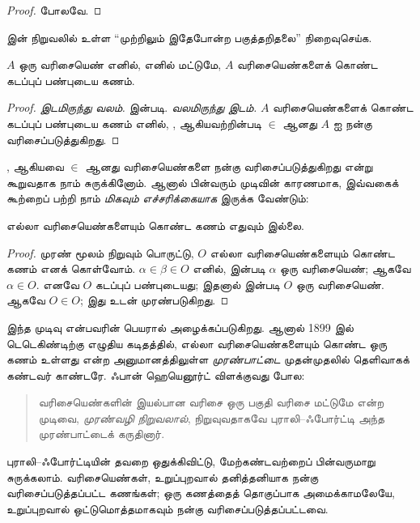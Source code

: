 \documentclass[../../../include/open-logic-section]{subfiles}
\begin{document}
\begin{proof}
 போலவே.
\end{proof}

\begin{prob}
 இன் நிறுவலில் உள்ள
``முற்றிலும் இதேபோன்ற பகுத்தறிதலை'' நிறைவுசெய்க.
\end{prob}

\begin{cor}
$A$ ஒரு வரிசையெண் எனில், எனில் மட்டுமே, $A$ வரிசையெண்களைக் கொண்ட
கடப்புப் பண்புடைய கணம்.
\end{cor}

\begin{proof}
\emph{இடமிருந்து வலம்.}  இன்படி.
\emph{வலமிருந்து இடம்.} $A$ வரிசையெண்களைக் கொண்ட கடப்புப் பண்புடைய
கணம் எனில், , 
ஆகியவற்றின்படி $\in$ ஆனது $A$ ஐ நன்கு வரிசைப்படுத்துகிறது.
\end{proof}

,  ஆகியவை $\in$ ஆனது
வரிசையெண்களை நன்கு வரிசைப்படுத்துகிறது என்று கூறுவதாக நாம் சுருக்கினோம்.
ஆனால் பின்வரும் முடிவின் காரணமாக, இவ்வகைக் கூற்றைப் பற்றி நாம்
\emph{மிகவும் எச்சரிக்கையாக} இருக்க வேண்டும்:

\begin{thm}[புராலி--ஃபோர்ட்டி முரணுரை]
எல்லா வரிசையெண்களையும் கொண்ட கணம் எதுவும் இல்லை.
\end{thm}

\begin{proof}
முரண் மூலம் நிறுவும் பொருட்டு, $O$ எல்லா வரிசையெண்களையும் கொண்ட கணம்
எனக் கொள்வோம். $\alpha \in \beta \in O$ எனில்,
 இன்படி $\alpha$ ஒரு வரிசையெண்; ஆகவே
$\alpha \in O$. எனவே $O$ கடப்புப் பண்புடையது; இதனால்
 இன்படி $O$ ஒரு வரிசையெண். ஆகவே $O \in O$;
இது  உடன் முரண்படுகிறது.
\end{proof}
\noindent
இந்த முடிவு \citeauthor{Burali-Forti1897} என்பவரின் பெயரால்
அழைக்கப்படுகிறது. ஆனால் 1899 இல் டெடெகிண்டிற்கு எழுதிய கடிதத்தில்,
எல்லா வரிசையெண்களையும் கொண்ட ஒரு கணம் உள்ளது என்ற அனுமானத்திலுள்ள
\emph{முரண்பாட்டை} முதன்முதலில் தெளிவாகக் கண்டவர் காண்டரே. ஃபான்
ஹெயெனூர்ட் விளக்குவது போல:
\begin{quote}
  வரிசையெண்களின் இயல்பான வரிசை ஒரு பகுதி வரிசை மட்டுமே என்ற முடிவை,
  \emph{முரண்வழி நிறுவலால்}, நிறுவுவதாகவே புராலி--ஃபோர்ட்டி அந்த
  முரண்பாட்டைக் கருதினார்.
  \citep[p.~105]{Heijenoort1967}
\end{quote}
புராலி--ஃபோர்ட்டியின் தவறை ஒதுக்கிவிட்டு, மேற்கண்டவற்றைப் பின்வருமாறு
சுருக்கலாம். வரிசையெண்கள், உறுப்புறவால் தனித்தனியாக நன்கு
வரிசைப்படுத்தப்பட்ட கணங்கள்; ஒரு கணத்தைத் தொகுப்பாக அமைக்காமலேயே,
உறுப்புறவால் ஒட்டுமொத்தமாகவும் நன்கு வரிசைப்படுத்தப்பட்டவை.
\end{document}
